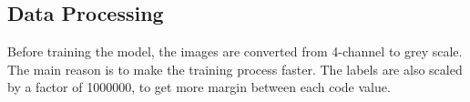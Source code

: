 \subsection{Data Processing}

Before training the model, the images are converted from 4-channel to grey scale. The main reason is to make the training process faster. The labels are also scaled by a factor of 1000000, to get more margin between each code value.